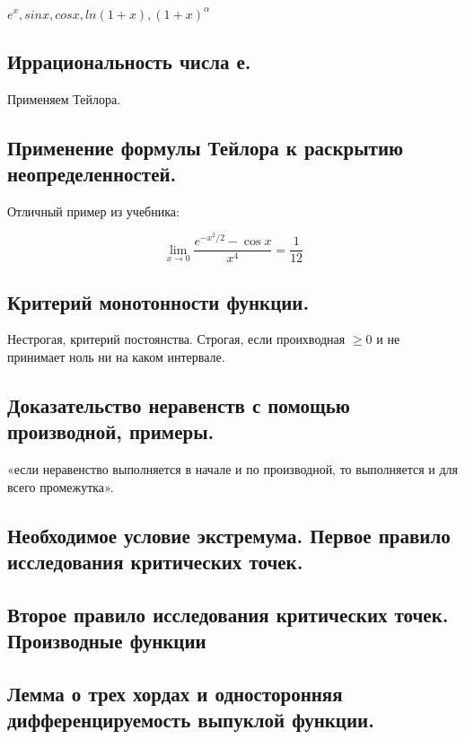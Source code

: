 \documentclass[12pt, a4paper]{article}
\begin{document}
$e^x, sin x, cos x, ln (1 + x), (1 + x)^{\alpha}$

\subsection{Иррациональность числа е.}

Применяем Тейлора.

\subsection{Применение формулы Тейлора к раскрытию неопределенностей.}

Отличный пример из учебника:

\begin{equation*}
    \lim_{x \rightarrow 0} \frac{e^{-x^{2} / 2}-\cos x}{x^{4}} = \frac{1}{12}
\end{equation*}

\subsection{Критерий монотонности функции.}

Нестрогая, критерий постоянства.
Строгая, если проихводная $\geqslant 0$ и не принимает ноль ни на каком интервале.

\subsection{Доказательство неравенств с помощью производной, примеры.}

«если неравенство выполняется в начале и по производной, то выполняется и для всего промежутка».


\subsection{Необходимое условие экстремума. Первое правило исследования критических точек.}



\subsection{Второе правило исследования критических точек. Производные функции}



\subsection{Лемма о трех хордах и односторонняя дифференцируемость выпуклой функции.}
\end{document}
